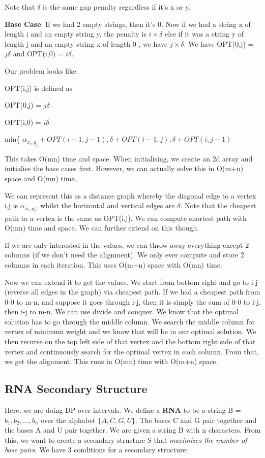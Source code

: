 \documentclass[11pt, oneside]{article}
\theoremstyle{definition}
\begin{document}
Note that $\delta$ is the same gap penalty regardless if it's x or y.

\textbf{Base Case}: If we had 2 empty strings, then it's 0. Now if we had a string x of length i and an empty string y, the penalty is $i \times \delta$ else if it was a string y of length j and an empty string x of length 0 , we have $j \times \delta$. We have OPT(0,j) = $j\delta$ and OPT(i,0) = $i\delta$.

Our problem looks like:
\begin{center}
  OPT(i,j) is defined as

  OPT(0,j) = $j\delta$

  OPT(i,0) = $i\delta$

  min\{  $\alpha_{x_i,y_j} + OPT(i-1,j-1), \delta + OPT(i-1,j), \delta + OPT(i,j-1)$
\end{center}

This takes O(mn) time and space. When initialising, we create an 2d array and initialise the base cases first. However, we can actually solve this in O(m+n) space and O(mn) time.

We can represent this as a distance graph whereby the diagonal edge to a vertex i,j is $\alpha_{x_i,y_j)}$ whilst the horizontal and vertical edges are $\delta$. Note that the cheapest path to a vertex is the same as OPT(i,j). We can compute shortest path with O(mn) time and space. We can further extend on this though.

If we are only interested in the values, we can throw away everything except 2 columns (if we don't need the alignment). We only ever compute and store 2 columns in each iteration. This uses O(m+n) space with O(mn) time.

Now we can extend it to get the values. We start from bottom right and go to i-j (reverse all edges in the graph) via cheapest path. If we had a cheapest path from 0-0 to m-n, and suppose it goes through i-j, then it is simply the sum of 0-0 to i-j, then i-j to m-n. We can use divide and conquer. We know that the optimal solution has to go through the middle column. We search the middle column for vertex of minimum weight and we know that will be in our optimal solution. We then recurse on the top left side of that vertex and the bottom right side of that vertex and continuously search for the optimal vertex in each column. From that, we get the alignment. This runs in O(mn) time with O(m+n) space.

\subsection{RNA Secondary Structure}
Here, we are doing DP over intervals. We define a \textbf{RNA} to be a string B = $b_1,b_2,...,b_n$ over the alphabet $\{A,C,G,U\}$. The bases C and G pair together and the bases A and U pair together. We are given a string B with n characters. From this, we want to create a secondary structure S that \textit{maximizes the number of base pairs}. We have 3 conditions for a secondary structure:
\end{document}
